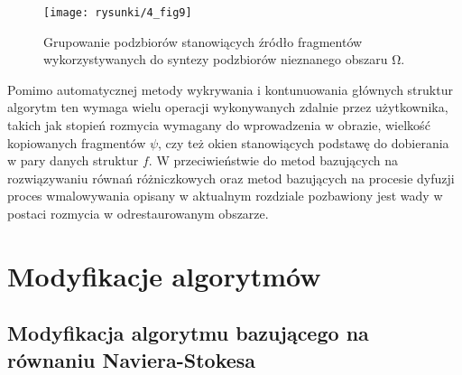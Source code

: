 \documentclass[12pt, twoside, openany]{report}
\theoremstyle{definition}
\begin{document}
\begin{figure}[!h]
	\centering
	\texttt{[image: rysunki/4\_fig9]}
	\caption{Grupowanie podzbiorów stanowiących źródło fragmentów wykorzystywanych do syntezy podzbiorów nieznanego obszaru $\boldsymbol{\mathrm{\Omega }}$.}
\label{4_fig9}
\end{figure}
Pomimo automatycznej metody wykrywania i kontunuowania głównych struktur algorytm ten wymaga wielu operacji wykonywanych zdalnie przez użytkownika, takich jak stopień rozmycia wymagany do wprowadzenia w obrazie, wielkość kopiowanych fragmentów $\psi $, czy też okien stanowiących podstawę do dobierania w pary danych struktur $f$. W przeciwieństwie do metod bazujących na rozwiązywaniu równań różniczkowych oraz metod bazujących na procesie dyfuzji proces wmalowywania opisany w aktualnym rozdziale pozbawiony jest wady w postaci rozmycia w odrestaurowanym obszarze.
\chapter{Modyfikacje algorytmów}
\section{Modyfikacja algorytmu bazującego na równaniu Naviera-Stokesa}
\end{document}
